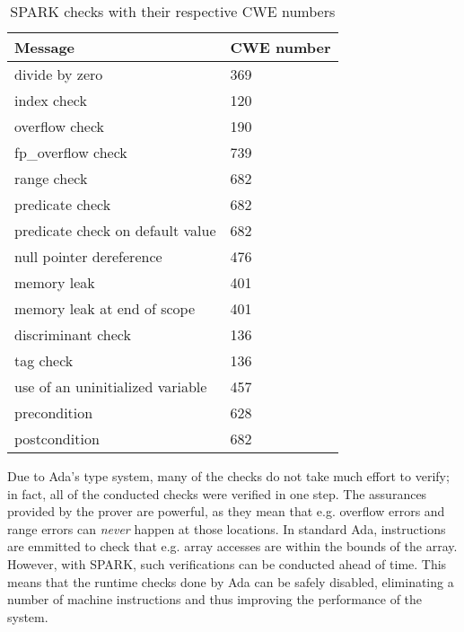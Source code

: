 \begin{table}[h]
  \centering
  \vspace{1em}
  \renewcommand{\arraystretch}{1.5}
  \begin{tabular}{| l | l |}
    \hline
    \textbf{Message} & \textbf{CWE number} \\ \hline
    divide by zero & 369 \\ \hline
    index check & 120 \\ \hline
    overflow check & 190 \\ \hline
    fp\_overflow check & 739 \\ \hline
    range check & 682 \\ \hline
    predicate check & 682 \\ \hline
    predicate check on default value & 682 \\ \hline
    null pointer dereference & 476 \\ \hline
    memory leak & 401 \\ \hline
    memory leak at end of scope & 401 \\ \hline
    discriminant check & 136 \\ \hline
    tag check & 136 \\ \hline
    use of an uninitialized variable & 457 \\ \hline
    precondition & 628 \\ \hline
    postcondition & 682 \\ \hline
  \end{tabular}
  \renewcommand{\arraystretch}{1}
  \vspace{1em}
  \caption{SPARK checks with their respective CWE numbers}
  \label{tab:checks and cwe numbers}
\end{table}

Due to Ada's type system, many of the checks do not take much effort to verify; in fact, all of the conducted checks were verified in one step.
The assurances provided by the prover are powerful, as they mean that e.g. overflow errors and range errors can \textit{never} happen at those locations.
In standard Ada, instructions are emmitted to check that e.g. array accesses are within the bounds of the array.
However, with SPARK, such verifications can be conducted ahead of time.
This means that the runtime checks done by Ada can be safely disabled, eliminating a number of machine instructions and thus improving the performance of the system.


